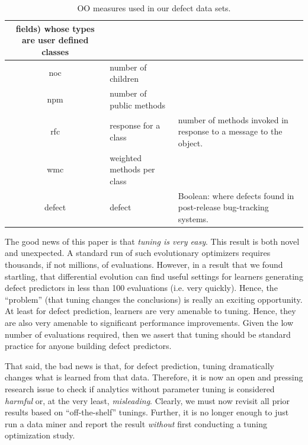 \documentclass{sig-alternative}
\begin{document}
\begin{table}[t]
\begin{center}
{\begin{tabular}{c|l|p{4.7in}}
fields) whose types are user defined classes\\\hline
noc &  number of children &\\\hline
npm & number of public methods & \\\hline
rfc & response for a class &number of  methods invoked in response to
a message to the object.\\\hline
wmc & weighted methods per class &\\\hline
\rowcolor{lightgray}
defect & defect & Boolean: where defects found in post-release bug-tracking systems.
\end{tabular}
}
\end{center}
\caption{OO measures used in our defect data sets.}\label{tab:ck}
\end{table}




The  good news of this paper  is that {\em tuning is very easy}.
This result is both novel and unexpected.
A standard run of such evolutionary optimizers requires   thousands,
if not millions, of evaluations. However, in a result that we found startling, that  differential evolution can find useful settings for learners generating defect predictors
in less than 100 evaluations (i.e. very quickly).
Hence,   the ``problem'' (that
tuning changes the conclusions) is really
an exciting opportunity. At least for defect prediction,
 learners are very   amenable to tuning. Hence, 
 they are  also very
amenable to significant performance improvements. Given the low
number of evaluations required, then we assert that tuning
  should be standard practice
for anyone building defect predictors.

That said, the bad news is that, for defect
prediction, tuning dramatically changes
  what is learned from that data. Therefore, it is now an open and pressing research issue to check if
analytics without parameter tuning is considered {\em harmful} or, at the 
very least, {\em misleading}.
Clearly, we  must now revisit all prior results   based on
``off-the-shelf'' tunings.
Further,
it is no longer enough to just run a data miner and report the result
{\em without} first conducting a tuning optimization study.


 
\end{document}
